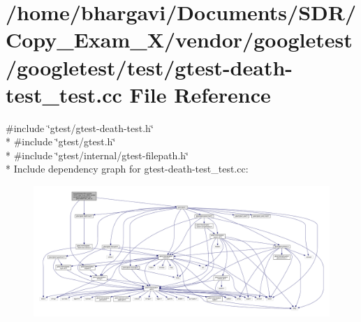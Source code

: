 \hypertarget{gtest-death-test__test_8cc}{}\section{/home/bhargavi/\+Documents/\+S\+D\+R/\+Copy\+\_\+\+Exam\+\_\+X/vendor/googletest/googletest/test/gtest-\/death-\/test\+\_\+test.cc File Reference}
\label{gtest-death-test__test_8cc}
{\ttfamily \#include \char`\"{}gtest/gtest-\/death-\/test.\+h\char`\"{}}\\*
{\ttfamily \#include \char`\"{}gtest/gtest.\+h\char`\"{}}\\*
{\ttfamily \#include \char`\"{}gtest/internal/gtest-\/filepath.\+h\char`\"{}}\\*
Include dependency graph for gtest-\/death-\/test\+\_\+test.cc\+:
\nopagebreak
\begin{figure}[H]
\begin{center}
\leavevmode
\includegraphics[width=350pt]{gtest-death-test__test_8cc__incl}
\end{center}
\end{figure}

